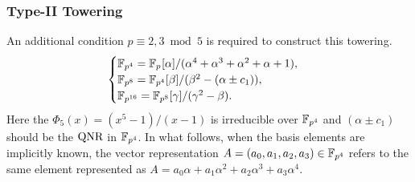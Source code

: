 \subsubsection{Type-II Towering}
An additional condition $p \equiv 2, 3 \bmod 5$ is required to construct this towering. 
\begin{equation}\label{towering_2}
\begin{cases}
{\mathbb{F}}_{p^{4}} = {\mathbb{F}}_{p^{}}[\alpha]/(\alpha^4+\alpha^3+\alpha^2+\alpha+1),  \\ 
{\mathbb{F}}_{p^{8}} = {\mathbb{F}}_{p^{4}}[\beta]/(\beta^2-(\alpha \pm c_1)),  \\ 
{\mathbb{F}}_{p^{16}} = {\mathbb{F}}_{p^{8}}[\gamma]/(\gamma^2-\beta). \\ 
\end{cases}
\end{equation}
Here the $\Phi_{5}(x) = (x^{5}-1)/(x-1)$ is irreducible over $\mathbb{F}_{p^4}$ and $(\alpha \pm c_1)$ should be the $\mbox{QNR}$ in $\mathbb{F}_{p^4}$.
In what follows, when the basis elements are implicitly known, the vector representation  $A=(a_0,a_1,a_2,a_3) \in \mathbb{F}_{p^4}$ refers to the same element represented as $A=a_0 \alpha+ a_1\alpha^2+ a_2\alpha^3+a_3\alpha^4$.

